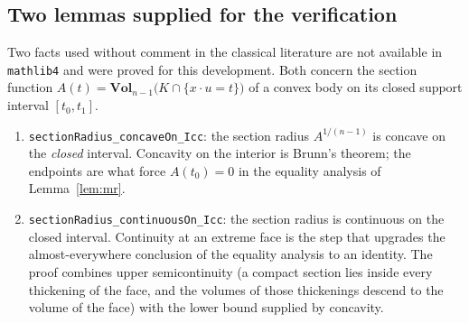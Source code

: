 \documentclass[12pt]{article}
\theoremstyle{definition}
\newcommand{\Vol}{\mathbf{Vol}}
\begin{document}
\subsection{Two lemmas supplied for the verification}\label{app:new}

Two facts used without comment in the classical literature are not available in
\texttt{mathlib4} and were proved for this development.  Both concern the
section function $A(t)=\Vol_{n-1}\bigl(K\cap\{x\cdot u=t\}\bigr)$ of a convex
body on its closed support interval $[t_0,t_1]$.

\begin{enumerate}
\item \texttt{sectionRadius\_concaveOn\_Icc}: the section radius
  $A^{1/(n-1)}$ is concave on the \emph{closed} interval.  Concavity on the
  interior is Brunn's theorem; the endpoints are what force $A(t_0)=0$ in the
  equality analysis of Lemma~\ref{lem:mr}.
\item \texttt{sectionRadius\_continuousOn\_Icc}: the section radius is
  continuous on the closed interval.  Continuity at an extreme face is the step
  that upgrades the almost-everywhere conclusion of the equality analysis to an
  identity.  The proof combines upper semicontinuity (a compact section lies
  inside every thickening of the face, and the volumes of those thickenings
  descend to the volume of the face) with the lower bound supplied by
  concavity.
\end{enumerate}
\end{document}
